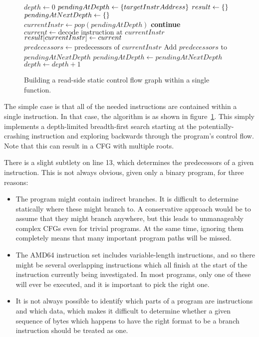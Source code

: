 \begin{figure}
\begin{algorithmic}[1]
\State $depth \gets 0$
\State $pendingAtDepth \gets \{targetInstrAddress\}$
\State $result \gets \{\}$
  \State $pendingAtNextDepth \gets \{\}$
    \State $currentInstr \gets pop(pendingAtDepth)$
      \State \textbf{continue}
    \EndIf
    \State $current \gets \text{decode instruction at } currentInstr$
    \State $result[currentInstr] \gets current$
    \State $predecessors \gets \text{predecessors of } currentInstr$
    \State Add $predecessors$ to $pendingAtNextDepth$
  \EndWhile
  \State $pendingAtDepth \gets pendingAtNextDepth$
  \State $depth \gets depth + 1$
\EndWhile
\end{algorithmic}
\caption{Building a read-side static control flow graph within a
  single function. }
\label{fig:derive:static_read_cfg_single_function}
\end{figure}

The simple case is that all of the needed instructions are contained
within a single instruction.  In that case, the algorithm is as shown
in figure~\ref{fig:derive:static_read_cfg_single_function}.  This
simply implements a depth-limited breadth-first search starting at the
potentially-crashing instruction and exploring backwards through the
program's control flow.  Note that this can result in a CFG with
multiple roots.

There is a slight subtlety on line 13, which determines the
predecessors of a given instruction.  This is not always obvious,
given only a binary program, for three reasons:

\begin{itemize}
\item
  The program might contain indirect branches.  It is difficult to
  determine statically where these might branch to.  A conservative
  approach would be to assume that they might branch anywhere, but
  this leads to unmanageably complex CFGs even for trivial programs.
  At the same time, ignoring them completely means that many important
  program paths will be missed.
\item
  The AMD64 instruction set includes variable-length instructions, and
  so there might be several overlapping instructions which all finish
  at the start of the instruction currently being investigated.  In
  most programs, only one of these will ever be executed, and it is
  important to pick the right one.
\item
  It is not always possible to identify which parts of a program are
  instructions and which data, which makes it difficult to determine
  whether a given sequence of bytes which happens to have the right
  format to be a branch instruction should be treated as one.
\end{itemize}

